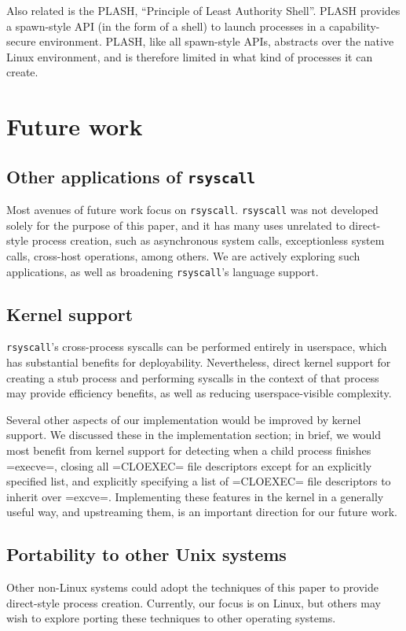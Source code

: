 \documentclass[sigplan]{acmart}
\begin{document}
Also related is the PLASH, ``Principle of Least Authority Shell''\cite{plash}.
PLASH provides a spawn-style API (in the form of a shell)
to launch processes in a capability-secure environment.
PLASH, like all spawn-style APIs, abstracts over the native Linux environment,
and is therefore limited in what kind of processes it can create.
\section{Future work}\label{future_work}
\subsection{Other applications of \texttt{rsyscall}}
Most avenues of future work focus on \texttt{rsyscall}.
\texttt{rsyscall} was not developed solely for the purpose of this paper,
and it has many uses unrelated to direct-style process creation,
such as asynchronous system calls, exceptionless system calls\cite{flexsc}, cross-host operations, among others.
We are actively exploring such applications,
as well as broadening \texttt{rsyscall}'s language support.
\subsection{Kernel support}
\texttt{rsyscall}'s cross-process syscalls can be performed entirely in userspace,
which has substantial benefits for deployability.
Nevertheless, direct kernel support for creating a stub process and performing syscalls in the context of that process
may provide efficiency benefits, as well as reducing userspace-visible complexity.

Several other aspects of our implementation would be improved by kernel support.
We discussed these in the implementation section;
in brief, we would most benefit from kernel support for
detecting when a child process finishes =execve=,
closing all =CLOEXEC= file descriptors except for an explicitly specified list,
and explicitly specifying a list of =CLOEXEC= file descriptors to inherit over =excve=.
Implementing these features in the kernel in a generally useful way, and upstreaming them,
is an important direction for our future work.
\subsection{Portability to other Unix systems}
Other non-Linux systems
could adopt the techniques of this paper
to provide direct-style process creation.
Currently, our focus is on Linux,
but others may wish to explore porting these techniques to other operating systems.
\end{document}
